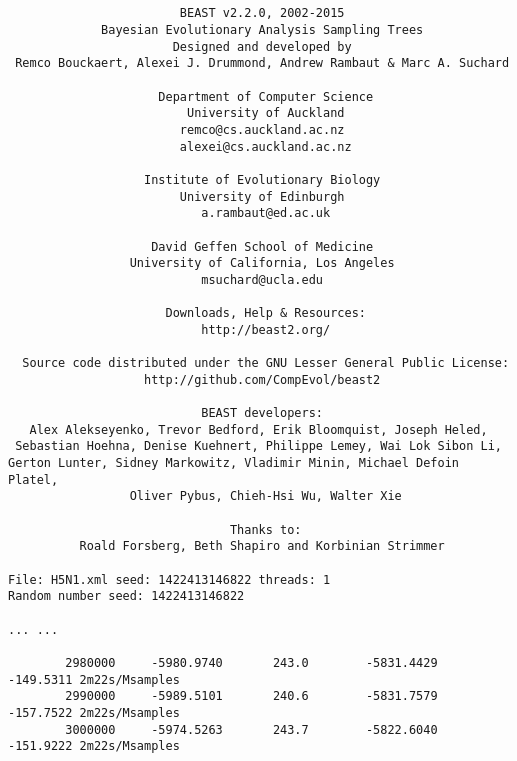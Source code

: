 \documentclass{article}
\begin{document}
{\tiny   
\begin{verbatim}


                        BEAST v2.2.0, 2002-2015
             Bayesian Evolutionary Analysis Sampling Trees
                       Designed and developed by
 Remco Bouckaert, Alexei J. Drummond, Andrew Rambaut & Marc A. Suchard
                                    
                     Department of Computer Science
                         University of Auckland
                        remco@cs.auckland.ac.nz
                        alexei@cs.auckland.ac.nz
                                    
                   Institute of Evolutionary Biology
                        University of Edinburgh
                           a.rambaut@ed.ac.uk
                                    
                    David Geffen School of Medicine
                 University of California, Los Angeles
                           msuchard@ucla.edu
                                    
                      Downloads, Help & Resources:
                           http://beast2.org/
                                    
  Source code distributed under the GNU Lesser General Public License:
                   http://github.com/CompEvol/beast2
                                    
                           BEAST developers:
   Alex Alekseyenko, Trevor Bedford, Erik Bloomquist, Joseph Heled, 
 Sebastian Hoehna, Denise Kuehnert, Philippe Lemey, Wai Lok Sibon Li, 
Gerton Lunter, Sidney Markowitz, Vladimir Minin, Michael Defoin Platel, 
                 Oliver Pybus, Chieh-Hsi Wu, Walter Xie
                                    
                               Thanks to:
          Roald Forsberg, Beth Shapiro and Korbinian Strimmer

File: H5N1.xml seed: 1422413146822 threads: 1
Random number seed: 1422413146822

... ...

        2980000     -5980.9740       243.0        -5831.4429      -149.5311 2m22s/Msamples
        2990000     -5989.5101       240.6        -5831.7579      -157.7522 2m22s/Msamples
        3000000     -5974.5263       243.7        -5822.6040      -151.9222 2m22s/Msamples


\end{verbatim}}
\end{document}
